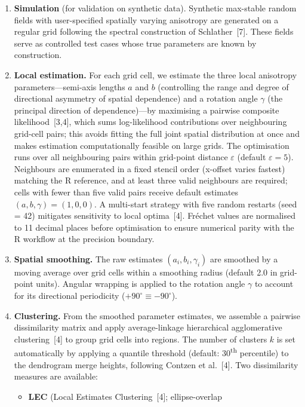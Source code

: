 \documentclass[preprint,12pt,a4paper]{elsarticle}
\newcommand{\rev}[1]{{#1}}
\newcommand{\revr}[1]{{#1}}
\begin{document}
\begin{enumerate}
\item \textbf{Simulation} (for validation on synthetic data).
  Synthetic max-stable random fields with
  user-specified spatially varying anisotropy are generated on a
  regular grid following the spectral construction of
  Schlather~[7]. These fields serve as controlled test cases whose
  true parameters are known by construction.
\item \textbf{Local estimation.}
  For each grid cell, we estimate the three local anisotropy
  parameters---semi-axis lengths $a$ and $b$ (controlling the range
  and degree of directional asymmetry of spatial dependence) and a
  rotation angle $\gamma$ (the principal direction of dependence)---by
  maximising a pairwise composite likelihood~[3,4]\revr{, which sums
  log-likelihood contributions over neighbouring grid-cell pairs;
  this avoids fitting the full joint spatial distribution at once and
  makes estimation computationally feasible on large grids.} The
  optimisation runs over all neighbouring pairs within grid-point
  distance $\varepsilon$ (default $\varepsilon=5$).
  \rev{Neighbours are enumerated in a fixed stencil order
  (x-offset varies fastest) matching the R reference, and at least
  three valid neighbours are required; cells with fewer than five
  valid pairs receive default estimates $(a,b,\gamma) = (1,0,0)$.
  A multi-start strategy with five random restarts (seed = 42)
  mitigates sensitivity to local optima~[4]. Fr\'{e}chet values
  are normalised to 11 decimal places before optimisation to
  ensure numerical parity with the R workflow at the precision
  boundary.}
\item \textbf{\rev{Spatial smoothing.}}
  \rev{The raw estimates $(a_i, b_i, \gamma_i)$ are smoothed by a
  moving average over grid cells within a smoothing radius (default
  2.0 in grid-point units).  Angular wrapping is applied to the
  rotation angle $\gamma$ to account for its directional
  periodicity ($+90^{\circ} \equiv -90^{\circ}$).}
\item \textbf{Clustering.}
  From the smoothed parameter estimates, we assemble a pairwise
  dissimilarity matrix and apply average-linkage hierarchical
  agglomerative clustering~[4] to group grid cells into regions.
  The number of clusters $k$ is set automatically by applying a
  quantile threshold (default: 30\textsuperscript{th} percentile)
  to the dendrogram merge heights, following Contzen et al.~[4].
  Two dissimilarity measures are available:
  \begin{itemize}
  \item \textbf{LEC} (Local Estimates Clustering~[4]; ellipse-overlap

\end{itemize}
\end{enumerate}
\end{document}
